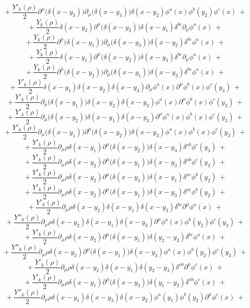 $$+\ \frac{Y'_k(\rho)}{2}\partial^\mu\big(\delta(x-y_3)\big)\partial_\mu\big(\delta(x - y_3)\big)\delta(x - y_2) \phi^a(x)\phi^b(y_2) \phi^c(x) \ +$$
$$+\ \frac{Y_k(\rho)}{2}\delta(x - y_2)\partial^\mu\big(\delta(x-y_3)\big)\delta(x - y_1)\delta^{bc}\partial_\mu\phi^a(x) \ +$$
$$+\ \frac{Y_k(\rho)}{2}\partial^\mu\big(\delta(x-y_1)\big)\partial_\mu\big(\delta(x - y_3)\big)\delta(x - y_2)\delta^{bc}\phi^a(x) \ +$$
$$+\ \frac{Y_k(\rho)}{2}\delta(x - y_1)\partial^\mu\big(\delta(x-y_2)\big)\delta(x - y_3)\delta^{bc}\partial_\mu\phi^a(x) \ +$$
$$+\ \frac{Y_k(\rho)}{2}\partial^\mu\big(\delta(x-y_2)\big)\partial_\mu\big(\delta(x - y_1)\big)\delta(x - y_3)\delta^{bc}\phi^a(x) \ +$$
$$+\ \frac{Y'_k(\rho)}{2}\delta(x-y_1)\delta(x - y_2)\delta(x - y_3) \partial_\mu\phi^a(x)\partial^\mu\phi^b(x)\phi^c(y_3) \ +$$
$$+\ \frac{Y'_k(\rho)}{2}\partial_\mu\big(\delta(x-y_1)\big)\delta(x - y_2)\delta(x - y_3) \phi^a(x)\partial^\mu\phi^b(x)\phi^c(y_3) \ +$$
$$+\ \frac{Y'_k(\rho)}{2}\partial_\mu\big(\delta(x-y_2)\big)\delta(x - y_1)\delta(x - y_3) \partial^\mu\phi^a(x)\phi^b(x)\phi^c(y_3) \ +$$
$$+\ \frac{Y'_k(\rho)}{2}\partial_\mu\big(\delta(x-y_1)\big)\partial^\mu\big(\delta(x - y_2)\big)\delta(x - y_3) \phi^a(x)\phi^b(x)\phi^c(y_3) \ +$$
$$+\ \frac{Y'_k(\rho)}{2}\partial_\mu\rho\delta(x-y_1)\partial^\mu\big(\delta(x - y_2)\big)\delta(x - y_3) \delta^{ab}\phi^c(y_3) \ +$$
$$+\ \frac{Y'_k(\rho)}{2}\partial_\mu\rho\delta(x-y_2)\partial^\mu\big(\delta(x - y_1)\big)\delta(x - y_3) \delta^{ab}\phi^c(y_3) \ +$$
$$+\ \frac{Y'_k(\rho)}{2}\partial_\mu\rho\delta(x-y_2)\partial^\mu\big(\delta(x - y_3)\big)\delta(x - y_1) \delta^{ac}\phi^b(y_2) \ +$$
$$+\ \frac{Y'_k(\rho)}{2}\partial_\mu\rho\delta(x-y_2)\partial^\mu\big(\delta(x - y_1)\big)\delta(x - y_3) \delta^{ac}\phi^b(y_2) \ +$$
$$+\ \frac{Y'_k(\rho)}{2}\partial_\mu\rho\delta(x-y_2)\delta(x - y_1)\delta(x - y_3) \delta^{bc}\partial^\mu\phi^a(x) \ +$$
$$+\ \frac{Y''_k(\rho)}{2}\partial_\mu\rho\delta(x-y_2)\delta(x - y_1)\delta(x - y_3) \partial^\mu\phi^a(x)\phi^b(y_2)\phi^c(y_3) \ +$$
$$+\ \frac{Y'_k(\rho)}{2}\partial_\mu\rho\delta(x-y_2)\partial^\mu\big(\delta(x - y_1)\big)\delta(y_2 - y_3) \delta^{bc}\phi^a(x) \ +$$
$$+\ \frac{Y''_k(\rho)}{2}\partial_\mu\rho\delta(x-y_2)\partial^\mu\big(\delta(x - y_1)\big)\delta(x - y_3) \phi^a(x)\phi^b(y_2)\phi^c(y_3) \ +$$
$$+\ \frac{Y'_k(\rho)}{2}\partial_\mu\rho\delta(x-y_2) \delta(x - y_1)\delta(y_2 - y_3) \delta^{ab}\partial^\mu\phi^c(x) \ +$$
$$+\ \frac{Y'_k(\rho)}{2}\partial_\mu\rho\delta(x-y_1)\partial^\mu\big(\delta(x - y_3)\big)\delta(y_1 - y_2) \delta^{ab}\phi^c(x) \ +$$
$$+\ \frac{Y''_k(\rho)}{2}\partial_\mu\rho\delta(x-y_1)\delta(x - y_3)\delta(x - y_2) \phi^a(y_1)\phi^b(y_2)\partial^\mu\phi^c(x) \ +$$
